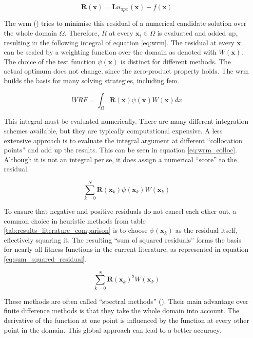 \documentclass[./\jobname.tex]{subfiles}
\begin{document}
\begin{equation}
\label{eq:residual}
\mathbf{R}(\mathbf{x}) = \mathbf{L}u_{apx}(\mathbf{x}) - f(\mathbf{x})
\end{equation}

The \gls{wrm} (\cite{shen_spectral_2011}) tries to minimise this residual of a numerical candidate solution over the whole domain $\Omega$. Therefore, $R$ at every $\mathbf{x}_i \in \Omega$ is evaluated and added up, resulting in the following integral of equation \ref{eq:wrm}. The residual at every $\mathbf{x}$ can be scaled by a weighting function over the domain as denoted with $W(\mathbf{x})$. The choice of the test function $\psi(\mathbf{x})$ is distinct for different methods. The actual optimum does not change, since the zero-product property holds. The \gls{wrm} builds the basis for many solving strategies, including \gls{fem}. 

\begin{equation}
\label{eq:wrm}
WRF = \int_{\Omega} \mathbf{R}(\mathbf{x}) \psi(\mathbf{x}) W(\mathbf{x}) dx
\end{equation}

This integral must be evaluated numerically. There are many different integration schemes available, but they are typically computational expensive. A less extensive approach is to evaluate the integral argument at different ``collocation points'' and add up the results. This can be seen in equation \ref{eq:wrm_colloc}. Although it is not an integral per se, it does assign a numerical ``score'' to the residual. 

\begin{equation}
\label{eq:wrm_colloc}
\sum_{k=0}^{N} \mathbf{R}(\mathbf{x}_k) \psi(\mathbf{x}_k) W(\mathbf{x}_k)
\end{equation}

To ensure that negative and positive residuals do not cancel each other out, a common choice in heuristic methods from table \ref{tab:results_literature_comparison} is to choose $\psi(\mathbf{x}_k)$ as the residual itself, effectively squaring it. The resulting ``sum of squared residuals'' forms the basis for nearly all fitness functions in the current literature, as represented in equation \ref{eq:sum_squared_residual}.

\begin{equation}
\label{eq:sum_squared_residual}
\sum_{k=0}^{N} \mathbf{R}(\mathbf{x}_k)^2 W(\mathbf{x}_k)
\end{equation}

These methods are often called ``spectral methods'' (\cite{shen_spectral_2011}). Their main advantage over finite difference methods is that they take the whole domain into account. The derivative of the function at one point is influenced by the function at every other point in the domain. This global approach can lead to a better accuracy. 
\end{document}
